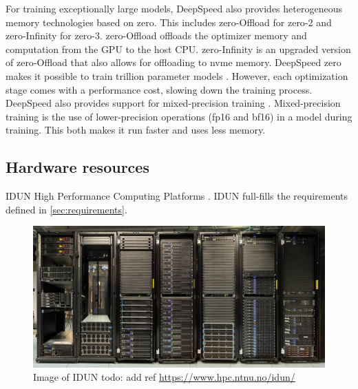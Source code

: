 \noindent
For training exceptionally large models, DeepSpeed also provides heterogeneous memory technologies based on \acrshort{zero}. This includes \acrshort{zero}-Offload for \acrshort{zero}-2 and \acrshort{zero}-Infinity \cite{zeroinfinity} for \acrshort{zero}-3. \acrshort{zero}-Offload offloads the optimizer memory and computation from the GPU to the host CPU. \acrshort{zero}-Infinity is an upgraded version of \acrshort{zero}-Offload that also allows for offloading to \gls{nvme} memory. DeepSpeed \acrshort{zero} makes it possible to train trillion parameter models \cite{zeroinfinity}. However, each optimization stage comes with a performance cost, slowing down the training process. DeepSpeed also provides support for mixed-precision training \cite{mixedprecision}. Mixed-precision training is the use of lower-precision operations (\acrshort{fp16} and \acrshort{bf16}) in a model during training. This both makes it run faster and uses less memory.

\subsection{Hardware resources}
\label{sec:hardware-resources}

IDUN High Performance Computing Platforms \cite{epic}.
IDUN full-fills the requirements defined in \cref{sec:requirements}.
\begin{figure}[htp]
    \centering
    \includegraphics[width=\textwidth]{figures/idun.jpeg}
    \caption{Image of IDUN todo: add ref \url{https://www.hpc.ntnu.no/idun/}}
    \label{fig:flowchart}
\end{figure}
